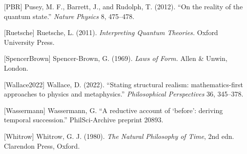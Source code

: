 \documentclass[
]{article}
\begin{document}
{[}PBR{]} Pusey, M. F., Barrett, J., and Rudolph, T. (2012). ``On the
reality of the quantum state.'' \emph{Nature Physics} 8, 475--478.

{[}Ruetsche{]} Ruetsche, L. (2011). \emph{Interpreting Quantum
Theories.} Oxford University Press.

{[}SpencerBrown{]} Spencer-Brown, G. (1969). \emph{Laws of Form.} Allen
\& Unwin, London.

{[}Wallace2022{]} Wallace, D. (2022). ``Stating structural realism:
mathematics-first approaches to physics and metaphysics.''
\emph{Philosophical Perspectives} 36, 345--378.

{[}Wassermann{]} Wassermann, G. ``A reductive account of `before':
deriving temporal succession.'' PhilSci-Archive preprint 20893.

{[}Whitrow{]} Whitrow, G. J. (1980). \emph{The Natural Philosophy of
Time}, 2nd edn. Clarendon Press, Oxford.
\end{document}
